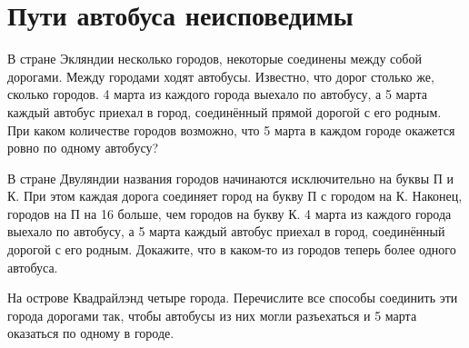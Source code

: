 \section{Пути автобуса неисповедимы}
\begin{itemize}

\itA В стране Экляндии несколько городов, некоторые соединены между собой дорогами. Между городами ходят автобусы. Известно, что дорог столько же, сколько городов. 4 марта из каждого города выехало по автобусу, а 5 марта каждый автобус приехал в город, соединённый прямой дорогой с его родным. При каком количестве городов возможно, что 5 марта в каждом городе окажется ровно по одному автобусу?

\itB В стране Двуляндии названия городов начинаются исключительно на буквы П и К. При этом каждая дорога соединяет город на букву П с городом на К. Наконец, городов на П на 16 больше, чем городов на букву К. 4 марта из каждого города выехало по автобусу, а 5 марта каждый автобус приехал в город, соединённый дорогой с его родным. Докажите, что в каком-то из городов теперь более одного автобуса.

\itC На острове Квадрайлэнд четыре города. Перечислите все способы соединить эти города дорогами так, чтобы автобусы из них могли разъехаться и 5 марта оказаться по одному в городе.
\end{itemize}